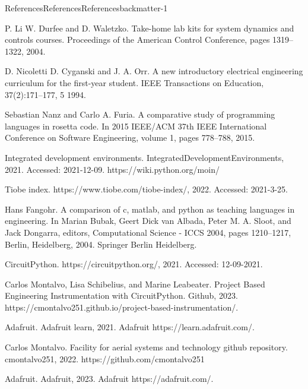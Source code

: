 \documentclass[oneside,10pt,]{book}
\numberwithin{equation}{section}
\begin{document}
\begin{references-chapter-numberless}{References}{References}{}{References}{}{}{backmatter-1}
\begin{referencelist}
\hypertarget{LabAtHome3}{}P. Li W. Durfee and D. Waletzko. Take-home lab kits for system dynamics and controls courses. Proceedings of the American Control Conference, pages 1319–1322, 2004.%

\hypertarget{LabAtHome4-EE}{}D. Nicoletti D. Cyganski and J. A. Orr. A new introductory electrical engineering curriculum for the first-year student. IEEE Transactions on Education, 37(2):171–177, 5 1994.%

\hypertarget{codetype}{}Sebastian Nanz and Carlo A. Furia. A comparative study of programming languages in rosetta code. In 2015 IEEE\slash{}ACM 37th IEEE International Conference on Software Engineering, volume 1, pages 778–788, 2015.%

\hypertarget{IDE}{}Integrated development environments. IntegratedDevelopmentEnvironments, 2021. Accessed: 2021-12-09. https:\slash{}\slash{}wiki.python.org\slash{}moin\slash{}%

\hypertarget{Tiobe}{}Tiobe index. https:\slash{}\slash{}www.tiobe.com\slash{}tiobe-index\slash{}, 2022. Accessed: 2021-3-25.%

\hypertarget{CodeComparison}{}Hans Fangohr. A comparison of c, matlab, and python as teaching languages in engineering. In Marian Bubak, Geert Dick van Albada, Peter M. A. Sloot, and Jack Dongarra, editors, Computational Science - ICCS 2004, pages 1210–1217, Berlin, Heidelberg, 2004. Springer Berlin Heidelberg.%

\hypertarget{CircuitPython}{}CircuitPython. https:\slash{}\slash{}circuitpython.org\slash{}, 2021. Accessed: 12-09-2021.%

\hypertarget{Gitbook}{}Carlos Montalvo, Lisa Schibelius, and Marine Leabeater. Project Based Engineering Instrumentation with CircuitPython. Github, 2023. https:\slash{}\slash{}cmontalvo251.github.io\slash{}project-based-instrumentation\slash{}.%

\hypertarget{Adafruit}{}Adafruit. Adafruit learn, 2021. Adafruit https:\slash{}\slash{}learn.adafruit.com\slash{}.%

\hypertarget{Github}{}Carlos Montalvo. Facility for aerial systems and technology github repository. cmontalvo251, 2022. https:\slash{}\slash{}github.com\slash{}cmontalvo251%

\hypertarget{AdafruitMAIN}{}Adafruit. Adafruit, 2023. Adafruit https:\slash{}\slash{}adafruit.com\slash{}.%


\end{referencelist}
\end{references-chapter-numberless}
\end{document}
